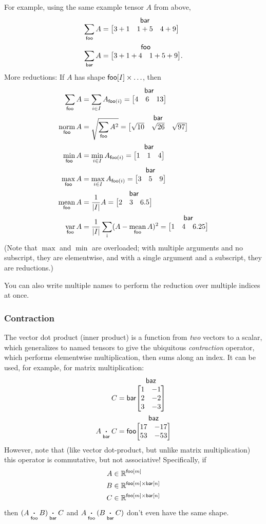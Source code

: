 \documentclass{article}
\makeatletter
\newcommand{\nmatrix}[3]{\name{#1}\begin{array}[b]{@{}c@{}}\name{#2}\\\begin{bmatrix}#3\end{bmatrix}\end{array}}
\makeatother
\begin{document}
For example, using the same example tensor $A$ from above,
\begin{align*}
\nsum{foo} A &= \nmatrix{}{bar}{
  3+1 & 1+5 & 4+9
} \\
\nsum{bar} A &= \nmatrix{}{foo}{
  3+1+4 & 1+5+9
}.
\end{align*}
More reductions: If $A$ has shape $\mathsf{foo}[I] \times \ldots$, then
\begin{align*}
  \nsum{foo} A &= \sum_{i \in I} A_{\nidx{foo}{i}} = \nmatrix{}{bar}{4 & 6 & 13} \\
  \nfun{foo}{norm} A &= \sqrt{\nsum{foo} A^2} = \nmatrix{}{bar}{\sqrt{10} & \sqrt{26} & \sqrt{97}} \\
  \nfun{foo}{min} A &= \min_{i \in I} A_{\nidx{foo}{i}} = \nmatrix{}{bar}{1 & 1 & 4} \\
  \nfun{foo}{max} A &= \max_{i \in I} A_{\nidx{foo}{i}} = \nmatrix{}{bar}{3 & 5 & 9} \\
  \nfun{foo}{mean} A &= \frac{1}{|I|} A = \nmatrix{}{bar}{2 & 3 & 6.5} \\
  \nfun{foo}{var} A &= \frac1{|I|} \nsum{i} (A - \nfun{foo}{mean} A)^2 = \nmatrix{}{bar}{1 & 4 & 6.25}
\end{align*}
(Note that $\max$ and $\min$ are overloaded; with multiple arguments and no subscript, they are elementwise, and with a single argument and a subscript, they are reductions.)

You can also write multiple names to perform the reduction over multiple indices at once.

\subsubsection{Contraction}

The vector dot product (inner product) is a function from \emph{two} vectors to a scalar, which generalizes to named tensors to give the ubiquitous \emph{contraction} operator, which performs elementwise multiplication, then sums along an index. It can be used, for example, for matrix multiplication:
\begin{align*}
C &= \nmatrix{bar}{baz}{
  1 & -1 \\ 2 & -2 \\ 3 & -3
} \\
A \ndot{bar} C &= \nmatrix{foo}{baz}{
  17 & -17 \\
  53 & -53
}
\end{align*}
However, note that (like vector dot-product, but unlike matrix multiplication) this operator is commutative, but not associative! Specifically, if
\begin{align*}
A &\in \mathbb{R}^{\mathsf{foo}[m]} \\
B &\in \mathbb{R}^{\mathsf{foo}[m] \times\mathsf{bar}[n]} \\
C &\in \mathbb{R}^{\mathsf{foo}[m] \times\mathsf{bar}[n]}
\end{align*}
then $(A \mathbin{\mathop{\boldsymbol\cdot}\limits_{\mathsf{foo}}} B) \mathbin{\mathop{\boldsymbol\cdot}\limits_{\mathsf{bar}}} C$ and $A \mathbin{\mathop{\boldsymbol\cdot}\limits_{\mathsf{foo}}} (B \mathbin{\mathop{\boldsymbol\cdot}\limits_{\mathsf{bar}}} C)$ don't even have the same shape.
\end{document}
